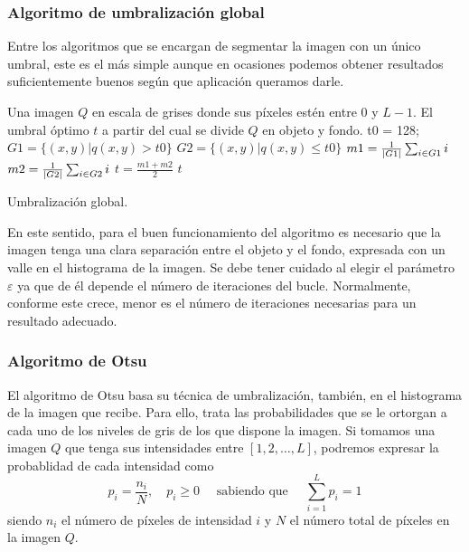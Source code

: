 \subsubsection{Algoritmo de umbralización global}

Entre los algoritmos que se encargan de segmentar la imagen con un único umbral, este es el más simple aunque en ocasiones podemos obtener resultados suficientemente buenos según que aplicación queramos darle.

\begin{algorithm}[!ht]
\begin{algorithmic}[1]
\REQUIRE Una imagen $Q$ en escala de grises donde sus píxeles estén entre $0$ y $L-1$.
\ENSURE El umbral óptimo $t$ a partir del cual se divide $Q$ en objeto y fondo.
\STATE t0 = 128; 
\REPEAT
\STATE $G1 = \{(x, y) | q(x, y) > t0\}$
\STATE $G2 = \{(x, y) | q(x, y) \leq t0\}$
\STATE $m1 = \frac{1}{\left\vert G1\right\vert} \sum_{i\in G1} i$
\STATE $m2 = \frac{1}{\left\vert G2\right\vert} \sum_{i\in G2} i$
\STATE $t = \frac{m1+m2}{2}$
\RETURN $t$
\end{algorithmic}
\caption{Umbralización global.}\label{alg:global}
\end{algorithm}

En este sentido, para el buen funcionamiento del algoritmo es necesario que la imagen tenga una clara separación entre el objeto y el fondo, expresada con un valle en el histograma de la imagen. Se debe tener cuidado al elegir el parámetro $\varepsilon$ ya que de él depende el número de iteraciones del bucle. Normalmente, conforme este crece, menor es el número de iteraciones necesarias para un resultado adecuado.


\subsubsection{Algoritmo de Otsu}

El algoritmo de Otsu \cite{art:otsu} basa su técnica de umbralización, también, en el histograma de la imagen que recibe. Para ello, trata las probabilidades que se le ortorgan a cada uno de los niveles de gris de los que dispone la imagen. Si tomamos una imagen $Q$ que tenga sus intensidades entre $[1, 2, \dots, L]$, podremos expresar la probablidad de cada intensidad como
$$p_i = \frac{n_i}{N}, \quad p_i \geq 0\quad\text{ sabiendo que }\quad\sum_{i=1}^{L}p_i=1$$
siendo $n_i$ el número de píxeles de intensidad $i$ y $N$ el número total de píxeles en la imagen $Q$.

